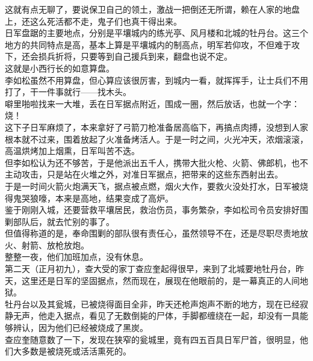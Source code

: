 \begin{multicols}{\theparacolNo}
这就有点无聊了，要说保卫自己的领土，激战一把倒还无所谓，赖在人家的地盘上，还这么死活都不走，鬼子们也真干得出来。\\

日军盘踞的主要地点，分别是平壤城内的练光亭、风月楼和北城的牡丹台。这三个地方的共同特点是高，基本上算是平壤城内的制高点，明军若仰攻，不但难于攻下，还会损兵折将，只要等到自己援兵到来，翻盘也说不定。\\

这就是小西行长的如意算盘。\\

李如松虽然不用算盘，但心算应该很厉害，到城内一看，就挥挥手，让士兵们不用打了，干一件事就行——找木头。\\

噼里啪啦找来一大堆，丢在日军据点附近，围成一圈，然后放话，也就一个字：烧！\\

这下子日军麻烦了，本来拿好了弓箭刀枪准备居高临下，再搞点肉搏，没想到人家根本就不过来，围着放起了火准备烤活人。于是一时之间，火光冲天，浓烟滚滚，高温烘烤加上烟熏，日军叫苦不迭。\\

但李如松认为还不够苦，于是他派出五千人，携带大批火枪、火箭、佛郎机，也不主动攻击，只是站在火堆之外，对准日军据点，把带来的这些东西射出去。\\

于是一时间火箭火炮满天飞，据点被点燃，烟火大作，要救火没处打水，日军被烧得鬼哭狼嚎，本来是高地，结果变成了高炉。\\

鉴于刚刚入城，还要营救平壤居民，救治伤员，事务繁杂，李如松司令员安排好围剿部队后，就去忙别的事了。\\

但值得称道的是，奉命围剿的部队很有责任心，虽然领导不在，还是尽职尽责地放火、射箭、放枪放炮。\\

整整一夜，他们加班加点，没有休息。\\

第二天（正月初九），查大受的家丁查应奎起得很早，来到了北城要地牡丹台，昨天，这里还是日军的坚固据点，然而现在，展现在他眼前的，是一幕真正的人间地狱。\\

牡丹台以及其瓮城，已被烧得面目全非，昨天还枪声炮声不断的地方，现在已经寂静无声，他走入据点，看见了无数倒毙的尸体，手脚都缠绕在一起，却没有一具能够辨认，因为他们已经被烧成了黑炭。\\

查应奎随意数了一下，发现在狭窄的瓮城里，竟有四五百具日军尸首，很明显，他们大多数是被烧死或活活熏死的。\\


\end{multicols}
